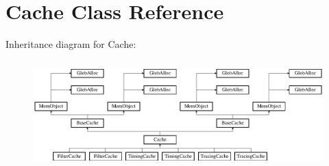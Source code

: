 \hypertarget{classCache}{\section{Cache Class Reference}
\label{classCache}
}
Inheritance diagram for Cache\-:\begin{figure}[H]
\begin{center}
\leavevmode
\includegraphics[height=4.200000cm]{classCache}
\end{center}
\end{figure}
